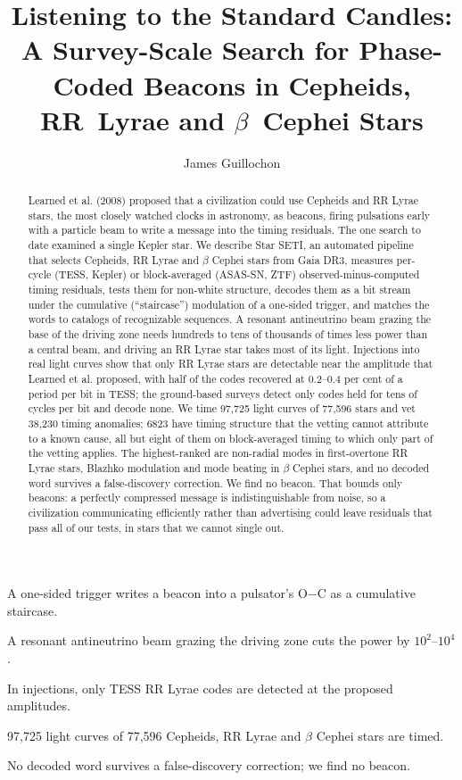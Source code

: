 \documentclass[final,5p]{elsarticle}
\begin{document}
\begin{frontmatter}

\title{Listening to the Standard Candles: A Survey-Scale Search for Phase-Coded Beacons in Cepheids, RR~Lyrae and $\beta$~Cephei Stars}

\author{James Guillochon}

\begin{abstract}
Learned et al. (2008) proposed that a civilization could use Cepheids and RR Lyrae stars, the most closely watched clocks in astronomy, as beacons, firing pulsations early with a particle beam to write a message into the timing residuals. The one search to date examined a single Kepler star. We describe Star SETI, an automated pipeline that selects Cepheids, RR Lyrae and $\beta$ Cephei stars from Gaia DR3, measures per-cycle (TESS, Kepler) or block-averaged (ASAS-SN, ZTF) observed-minus-computed timing residuals, tests them for non-white structure, decodes them as a bit stream under the cumulative (``staircase'') modulation of a one-sided trigger, and matches the words to catalogs of recognizable sequences. A resonant antineutrino beam grazing the base of the driving zone needs hundreds to tens of thousands of times less power than a central beam, and driving an RR Lyrae star takes most of its light. Injections into real light curves show that only RR Lyrae stars are detectable near the amplitude that Learned et al. proposed, with half of the codes recovered at 0.2--0.4 per cent of a period per bit in TESS; the ground-based surveys detect only codes held for tens of cycles per bit and decode none. We time 97,725 light curves of 77,596 stars and vet 38,230 timing anomalies; 6823 have timing structure that the vetting cannot attribute to a known cause, all but eight of them on block-averaged timing to which only part of the vetting applies. The highest-ranked are non-radial modes in first-overtone RR Lyrae stars, Blazhko modulation and mode beating in $\beta$ Cephei stars, and no decoded word survives a false-discovery correction. We find no beacon. That bounds only beacons: a perfectly compressed message is indistinguishable from noise, so a civilization communicating efficiently rather than advertising could leave residuals that pass all of our tests, in stars that we cannot single out.
\end{abstract}

\begin{highlights}
\item A one-sided trigger writes a beacon into a pulsator's O$-$C as a cumulative staircase.
\item A resonant antineutrino beam grazing the driving zone cuts the power by $10^{2}$--$10^{4}$.
\item In injections, only TESS RR Lyrae codes are detected at the proposed amplitudes.
\item 97,725 light curves of 77,596 Cepheids, RR Lyrae and $\beta$ Cephei stars are timed.
\item No decoded word survives a false-discovery correction; we find no beacon.
\end{highlights}


\end{frontmatter}
\end{document}
